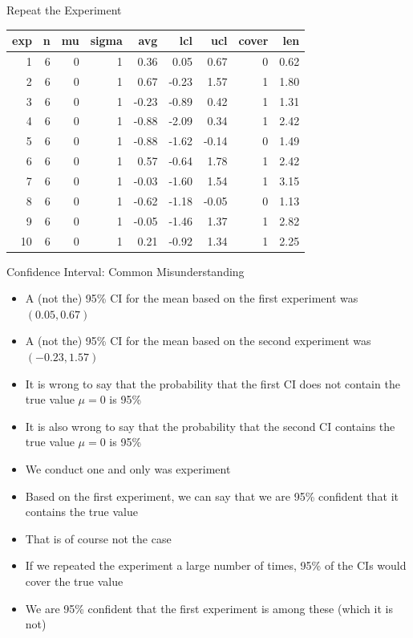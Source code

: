 \documentclass[xcolor=x11names,compress]{beamer}\usepackage[]{graphicx}\usepackage[]{color}
\newenvironment{knitrout}{}{} %
\begin{document}
\begin{frame}{Repeat the Experiment}
\begin{knitrout}\tiny
{}\color{fgcolor}
\begin{tabular}{r|r|r|r|r|r|r|r|r}
\hline
exp & n & mu & sigma & avg & lcl & ucl & cover & len\\
\hline
1 & 6 & 0 & 1 & 0.36 & 0.05 & 0.67 & 0 & 0.62\\
\hline
2 & 6 & 0 & 1 & 0.67 & -0.23 & 1.57 & 1 & 1.80\\
\hline
3 & 6 & 0 & 1 & -0.23 & -0.89 & 0.42 & 1 & 1.31\\
\hline
4 & 6 & 0 & 1 & -0.88 & -2.09 & 0.34 & 1 & 2.42\\
\hline
5 & 6 & 0 & 1 & -0.88 & -1.62 & -0.14 & 0 & 1.49\\
\hline
6 & 6 & 0 & 1 & 0.57 & -0.64 & 1.78 & 1 & 2.42\\
\hline
7 & 6 & 0 & 1 & -0.03 & -1.60 & 1.54 & 1 & 3.15\\
\hline
8 & 6 & 0 & 1 & -0.62 & -1.18 & -0.05 & 0 & 1.13\\
\hline
9 & 6 & 0 & 1 & -0.05 & -1.46 & 1.37 & 1 & 2.82\\
\hline
10 & 6 & 0 & 1 & 0.21 & -0.92 & 1.34 & 1 & 2.25\\
\hline
\end{tabular}


\end{knitrout}
\end{frame}
\begin{frame}{Confidence Interval: Common Misunderstanding}
  \begin{itemize}
  \item A (not the) 95\% CI for the mean based on the first experiment was
        $(0.05,0.67)$
  \item A (not the) 95\% CI for the mean based on the second experiment was
        $(\ensuremath{-0.23},1.57)$
  \item It is wrong to say that the probability that the first CI does not contain the true value
        $\mu=0$ is 95\%
  \item It is also wrong to say that the probability that the second CI contains the true value
        $\mu=0$ is 95\%
  \item We conduct one and only was experiment
  \item Based on the first experiment, we can say that we are 95\% confident that it contains the true value
  \item That is of course not the case
  \item If we repeated the experiment a large number of times, 95\% of the CIs would cover the true
    value
  \item We are 95\% confident that the first experiment is among these (which it is not)
  \end{itemize}
\end{frame}
\end{document}

